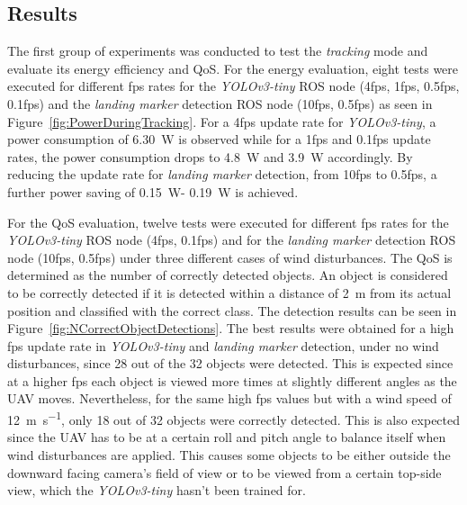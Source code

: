 \documentclass[conference]{IEEEtran}
\begin{document}
\subsection{Results}

The first group of experiments was conducted to test the \emph{tracking} mode and evaluate its 
energy efficiency and QoS. For the energy 
evaluation, eight tests were executed for different fps rates 
for the \emph{YOLOv3-tiny} ROS node (4fps, 1fps, 0.5fps, 0.1fps) and 
the \emph{landing marker} detection ROS node (10fps, 0.5fps) as 
%
seen in Figure~\ref{fig:PowerDuringTracking}. For a 4fps update rate
for \emph{YOLOv3-tiny}, a power consumption of \SI{6.30}{\watt} is observed while
for a 1fps and 0.1fps update rates, the power consumption drops to
\SI{4,8}{\watt} and \SI{3.9}{\watt} accordingly. By reducing the update rate for
\emph{landing marker} detection, from 10fps to 0.5fps, a further power
saving of \SI{0.15}{\watt}- \SI{0.19}{\watt} is achieved.



For the QoS evaluation, twelve tests were executed for different 
fps rates for the \emph{YOLOv3-tiny} ROS node (4fps, 0.1fps) and for 
the \emph{landing marker} detection ROS node (10fps, 0.5fps) under 
three different cases of wind disturbances. 
%
The QoS is determined as the number of correctly detected objects. An
object is considered to be correctly detected if it is detected within
a distance of \SI{2}{\meter} from its actual position and classified with
the correct class. The detection results can be seen in
Figure~\ref{fig:NCorrectObjectDetections}. The best results were
obtained for a high fps update rate in \emph{YOLOv3-tiny} and \emph{landing marker} 
detection, under no wind disturbances, since 28 out of the 32
objects were detected. This is expected since at a higher fps each object is viewed more times at slightly different angles as the UAV moves. Nevertheless, for the same high fps values but
with a wind speed of \SI{12}{\meter \per \second}, only 18 out of 32 objects were
correctly detected. This is also expected since the UAV has to be at a certain roll and pitch angle to balance itself when wind disturbances are applied. This causes some objects to be either outside the downward facing camera's field of view or to be viewed from a certain top-side view, which the \emph{YOLOv3-tiny} hasn't been trained for.
\end{document}
